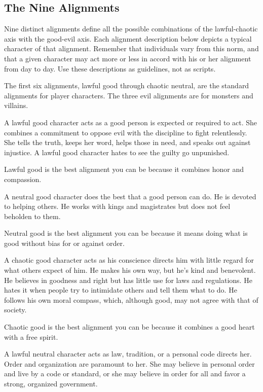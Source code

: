 \subsection{The Nine Alignments}
Nine distinct alignments define all the possible combinations of the lawful-chaotic axis with the good-evil axis. Each alignment description below depicts a typical character of that alignment. Remember that individuals vary from this norm, and that a given character may act more or less in accord with his or her alignment from day to day. Use these descriptions as guidelines, not as scripts.

The first six alignments, lawful good through chaotic neutral, are the standard alignments for player characters. The three evil alignments are for monsters and villains.

 A lawful good character acts as a good person is expected or required to act. She combines a commitment to oppose evil with the discipline to fight relentlessly. She tells the truth, keeps her word, helps those in need, and speaks out against injustice. A lawful good character hates to see the guilty go unpunished.

Lawful good is the best alignment you can be because it combines honor and compassion.

 A neutral good character does the best that a good person can do. He is devoted to helping others. He works with kings and magistrates but does not feel beholden to them.

Neutral good is the best alignment you can be because it means doing what is good without bias for or against order.

 A chaotic good character acts as his conscience directs him with little regard for what others expect of him. He makes his own way, but he's kind and benevolent. He believes in goodness and right but has little use for laws and regulations. He hates it when people try to intimidate others and tell them what to do. He follows his own moral compass, which, although good, may not agree with that of society.

Chaotic good is the best alignment you can be because it combines a good heart with a free spirit.

 A lawful neutral character acts as law, tradition, or a personal code directs her. Order and organization are paramount to her. She may believe in personal order and live by a code or standard, or she may believe in order for all and favor a strong, organized government.

